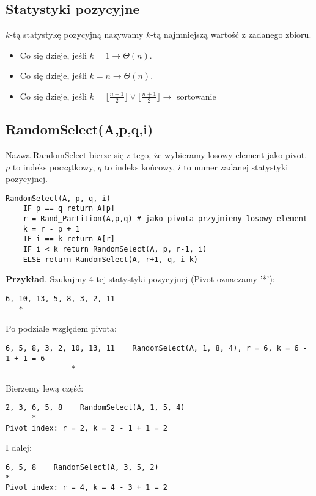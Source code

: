 \documentclass{article}
\numberwithin{equation}{subsection}
\newenvironment{definition}[1]{%
    \trivlist
    \item[\hskip\labelsep\textbf{Definition. #1.}]
    \ignorespaces
}{%
    \endtrivlist
}
\begin{document}
\subsection{Statystyki pozycyjne}

\begin{definition}{Statystyka pozycyjna}
    $k$-tą statystykę pozycyjną nazywamy $k$-tą najmniejszą wartość z zadanego zbioru.
\end{definition}

\begin{itemize} 
    \item Co się dzieje, jeśli $k=1 \rightarrow \Theta(n)$.
    \item Co się dzieje, jeśli $k=n \rightarrow \Theta(n)$. 
    \item Co się dzieje, jeśli $k = \lfloor \frac{n-1}{2} \rfloor \lor \lfloor \frac{n+1}{2} \rfloor \rightarrow$
    sortowanie 
\end{itemize}

\subsection{RandomSelect(A,p,q,i)}

Nazwa RandomSelect bierze się z tego, że wybieramy losowy element jako pivot.
$p$ to indeks początkowy, $q$ to indeks końcowy, $i$ to numer zadanej statystyki pozycyjnej.
\begin{verbatim}
RandomSelect(A, p, q, i)
    IF p == q return A[p]
    r = Rand_Partition(A,p,q) # jako pivota przyjmieny losowy element
    k = r - p + 1
    IF i == k return A[r]
    IF i < k return RandomSelect(A, p, r-1, i)
    ELSE return RandomSelect(A, r+1, q, i-k)
\end{verbatim}
\textbf{Przykład}. Szukajmy 4-tej statystyki pozycyjnej (Pivot oznaczamy '*'):

\begin{verbatim}
6, 10, 13, 5, 8, 3, 2, 11
   *
\end{verbatim}

\noindent
Po podziale względem pivota:

\begin{verbatim}
6, 5, 8, 3, 2, 10, 13, 11    RandomSelect(A, 1, 8, 4), r = 6, k = 6 - 1 + 1 = 6
               *
\end{verbatim}
Bierzemy lewą część:
\begin{verbatim}
2, 3, 6, 5, 8    RandomSelect(A, 1, 5, 4)
      *
Pivot index: r = 2, k = 2 - 1 + 1 = 2
\end{verbatim}
I dalej:
\begin{verbatim}
6, 5, 8    RandomSelect(A, 3, 5, 2)
*
Pivot index: r = 4, k = 4 - 3 + 1 = 2
\end{verbatim}
\end{document}
